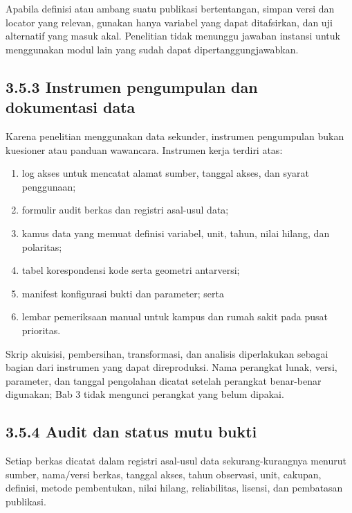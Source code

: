 \documentclass[
  indonesian,
  11pt,
  a4paper,
  oneside,
  openany]{report}
\providecommand{\tightlist}{%
  \setlength{\itemsep}{0pt}\setlength{\parskip}{0pt}}
\begin{document}
Apabila definisi atau ambang suatu publikasi bertentangan, simpan versi
dan locator yang relevan, gunakan hanya variabel yang dapat ditafsirkan,
dan uji alternatif yang masuk akal. Penelitian tidak menunggu jawaban
instansi untuk menggunakan modul lain yang sudah dapat
dipertanggungjawabkan.

\subsection{3.5.3 Instrumen pengumpulan dan dokumentasi
data}\label{instrumen-pengumpulan-dan-dokumentasi-data}

Karena penelitian menggunakan data sekunder, instrumen pengumpulan bukan
kuesioner atau panduan wawancara. Instrumen kerja terdiri atas:

\begin{enumerate}
\def\labelenumi{\arabic{enumi}.}
\tightlist
\item
  log akses untuk mencatat alamat sumber, tanggal akses, dan syarat
  penggunaan;
\item
  formulir audit berkas dan registri asal-usul data;
\item
  kamus data yang memuat definisi variabel, unit, tahun, nilai hilang,
  dan polaritas;
\item
  tabel korespondensi kode serta geometri antarversi;
\item
  manifest konfigurasi bukti dan parameter; serta
\item
  lembar pemeriksaan manual untuk kampus dan rumah sakit pada pusat
  prioritas.
\end{enumerate}

Skrip akuisisi, pembersihan, transformasi, dan analisis diperlakukan
sebagai bagian dari instrumen yang dapat direproduksi. Nama perangkat
lunak, versi, parameter, dan tanggal pengolahan dicatat setelah
perangkat benar-benar digunakan; Bab 3 tidak mengunci perangkat yang
belum dipakai.

\subsection{3.5.4 Audit dan status mutu
bukti}\label{audit-dan-status-mutu-bukti}

Setiap berkas dicatat dalam registri asal-usul data sekurang-kurangnya
menurut sumber, nama/versi berkas, tanggal akses, tahun observasi, unit,
cakupan, definisi, metode pembentukan, nilai hilang, reliabilitas,
lisensi, dan pembatasan publikasi.
\end{document}
